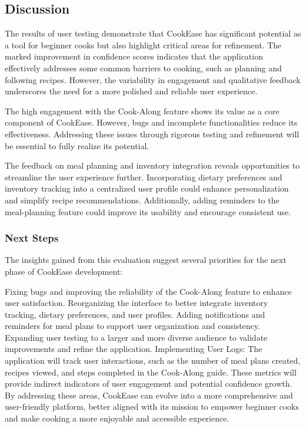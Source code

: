 \documentclass[10pt,twocolumn]{article}
\begin{document}
\subsection{Discussion}
The results of user testing demonstrate that CookEase has significant potential as a tool for beginner cooks but also highlight critical areas for refinement. The marked improvement in confidence scores indicates that the application effectively addresses some common barriers to cooking, such as planning and following recipes. However, the variability in engagement and qualitative feedback underscores the need for a more polished and reliable user experience.

The high engagement with the Cook-Along feature shows its value as a core component of CookEase. However, bugs and incomplete functionalities reduce its effectiveness. Addressing these issues through rigorous testing and refinement will be essential to fully realize its potential.

The feedback on meal planning and inventory integration reveals opportunities to streamline the user experience further. Incorporating dietary preferences and inventory tracking into a centralized user profile could enhance personalization and simplify recipe recommendations. Additionally, adding reminders to the meal-planning feature could improve its usability and encourage consistent use.

\subsubsection{Next Steps}
The insights gained from this evaluation suggest several priorities for the next phase of CookEase development:

Fixing bugs and improving the reliability of the Cook-Along feature to enhance user satisfaction.
Reorganizing the interface to better integrate inventory tracking, dietary preferences, and user profiles.
Adding notifications and reminders for meal plans to support user organization and consistency.
Expanding user testing to a larger and more diverse audience to validate improvements and refine the application.
Implementing User Logs: The application will track user interactions, such as the number of meal plans created, recipes viewed, and steps completed in the Cook-Along guide. These metrics will provide indirect indicators of user engagement and potential confidence growth.
By addressing these areas, CookEase can evolve into a more comprehensive and user-friendly platform, better aligned with its mission to empower beginner cooks and make cooking a more enjoyable and accessible experience.
\end{document}
